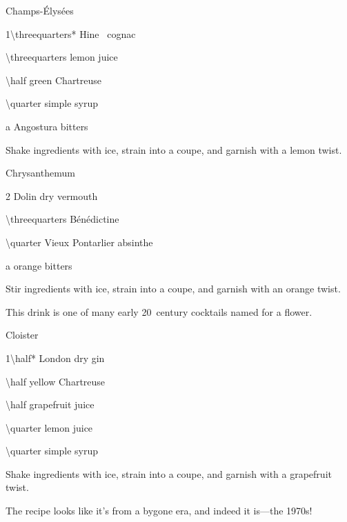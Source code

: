 \begin{Cocktail}[\PDT]{Champs-\'Elys\'ees}
  \begin{Ingredients}
  \item \SI{1\threequarters*}{\oz} Hine \vsop\ cognac
  \item \SI{\threequarters}{\oz} lemon juice
  \item \SI{\half}{\oz} green Chartreuse
  \item \SI{\quarter}{\oz} simple syrup
  \item a \si{\dash} Angostura bitters
  \end{Ingredients}
  
  \begin{Instructions}
	Shake ingredients with ice, strain into a coupe, and garnish with a lemon twist.
  \end{Instructions}
\end{Cocktail}

\begin{Cocktail}[\PDT]{Chrysanthemum}
  \begin{Ingredients}
  \item \SI{2}{\oz} Dolin dry vermouth
  \item \SI{\threequarters}{\oz} B\'en\'edictine
  \item \SI{\quarter}{\oz} Vieux Pontarlier absinthe
  \item a \si{\dash} orange bitters
  \end{Ingredients}
  
  \begin{Instructions}
	Stir ingredients with ice, strain into a coupe, and garnish with an orange twist.
	
	This drink is one of many early 20~century cocktails named for a flower.
  \end{Instructions}
\end{Cocktail}

\begin{Cocktail}[\PDT]{Cloister}
  \begin{Ingredients}
  \item \SI{1\half*}{\oz} London dry gin
  \item \SI{\half}{\oz} yellow Chartreuse
  \item \SI{\half}{\oz} grapefruit juice
  \item \SI{\quarter}{\oz} lemon juice
  \item \SI{\quarter}{\oz} simple syrup
  \end{Ingredients}
  
  \begin{Instructions}
	Shake ingredients with ice, strain into a coupe, and garnish with a grapefruit twist.
	
	The recipe looks like it's from a bygone era, and indeed it is---the 1970s!
  \end{Instructions}
\end{Cocktail}

